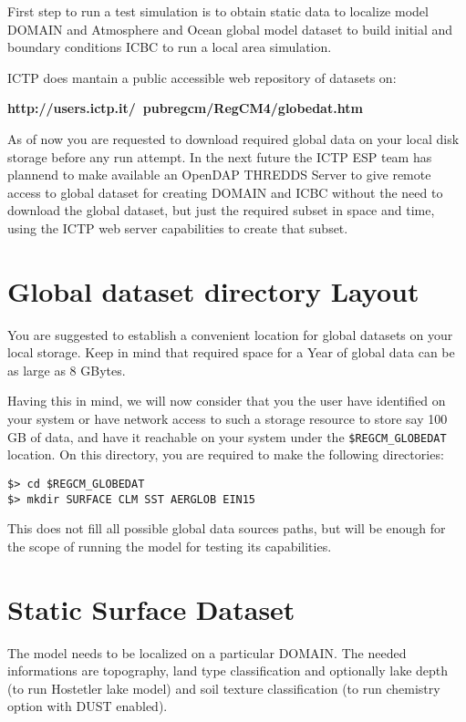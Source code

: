 %
%

First step to run a test simulation is to obtain static data to localize
model DOMAIN and Atmosphere and Ocean global model dataset to build initial
and boundary conditions ICBC to run a local area simulation.

ICTP does mantain a public accessible web repository of datasets on:

{\bf http://users.ictp.it/~pubregcm/RegCM4/globedat.htm}

As of now you are requested to download required global data on your local disk
storage before any run attempt. In the next future the ICTP ESP team has
plannend to make available an OpenDAP THREDDS Server to give remote access
to global dataset for creating DOMAIN and ICBC without the need to
download the global dataset, but just the required subset in space and time,
using the ICTP web server capabilities to create that subset.

\section{Global dataset directory Layout}

You are suggested to establish a convenient location for global datasets
on your local storage. Keep in mind that required space for a Year of global
data can be as large as 8 GBytes.

Having this in mind, we will now consider that you the user have identified
on your system or have network access to such a storage resource to store say
100 GB of data, and have it reachable on your system under the
\verb=$REGCM_GLOBEDAT= location.
On this directory, you are required to make the following directories:

\begin{Verbatim}
$> cd $REGCM_GLOBEDAT
$> mkdir SURFACE CLM SST AERGLOB EIN15
\end{Verbatim}

This does not fill all possible global data sources paths, but will be enough
for the scope of running the model for testing its capabilities.

\section{Static Surface Dataset}

The model needs to be localized on a particular DOMAIN. The needed informations
are topography, land type classification and optionally lake depth (to run
Hostetler lake model) and soil texture classification (to run chemistry option
with DUST enabled).


